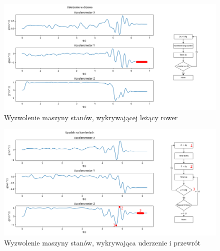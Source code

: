 \begin{figure}[h]
    \centering
    \includegraphics[width=16cm]{Graphics/Tree_title_to_fsm.png}
    \caption{Wyzwolenie maszyny stanów, wykrywającej leżący rower}
    \label{img:fsm3_recognize}
\end{figure}

\begin{figure}[h]
    \centering
    \includegraphics[width=16cm]{Graphics/Stones_title_to_fsm.png}
    \caption{Wyzwolenie maszyny stanów, wykrywająca uderzenie i przewrót}
    \label{img:fsm4_recognize}
\end{figure}